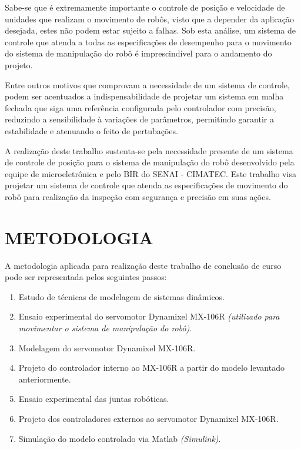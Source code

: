 \documentclass[12pt,oneside,a4paper, chapter=TITLE, section = TITLE, english, brazil]{abntex2}
\begin{document}
Sabe-se que é extremamente importante o controle de posição e velocidade de unidades que realizam o movimento de robôs, visto que a depender da aplicação desejada, estes não podem estar sujeito a falhas. Sob esta análise, um sistema de controle que atenda a todas as especificações de desempenho para o movimento do sistema de manipulação do robô é imprescindível para o andamento do projeto.

Entre outros motivos que comprovam a necessidade de um sistema de controle, podem ser acentuados a indispensabilidade de projetar um sistema em malha fechada que siga uma referência configurada pelo controlador com precisão, reduzindo a sensibilidade à variações de parâmetros, permitindo garantir a estabilidade e atenuando o feito de pertubações.

A realização deste trabalho sustenta-se pela necessidade presente de um sistema de controle de posição para o sistema de manipulação do robô desenvolvido pela equipe de microeletrônica e pelo BIR do SENAI - CIMATEC. Este trabalho visa projetar um sistema de controle que atenda as especificações de movimento do robô para realização da inspeção com segurança e precisão em suas ações.

\section{METODOLOGIA} %

A metodologia aplicada para realização deste trabalho de conclusão de curso pode ser representada pelos seguintes passos:

\begin{enumerate}

\item Estudo de técnicas de modelagem de sistemas dinâmicos.

\item Ensaio experimental do servomotor Dynamixel MX-106R \textit{(utilizado para movimentar o sistema de manipulação do robô)}.

\item Modelagem do servomotor Dynamixel MX-106R. 

\item Projeto do controlador interno ao MX-106R a partir do modelo levantado anteriormente.

\item Ensaio experimental das juntas robóticas.

\item Projeto dos controladores externos ao servomotor Dynamixel MX-106R.

\item Simulação do modelo controlado via Matlab \textit{(Simulink)}.

\end{enumerate}
\end{document}
